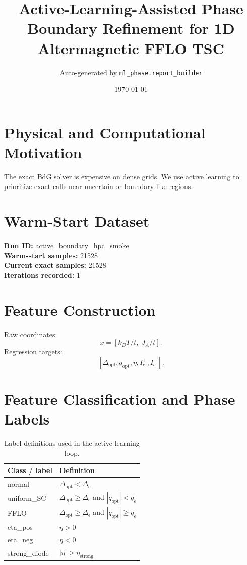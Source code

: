 \documentclass[11pt]{article}
\title{Active-Learning-Assisted Phase Boundary Refinement for 1D Altermagnetic FFLO TSC}
\author{Auto-generated by \texttt{ml\_phase.report\_builder}}
\date{\today}
\begin{document}
\maketitle

\section{Physical and Computational Motivation}
The exact BdG solver is expensive on dense grids. We use active learning to prioritize exact calls near uncertain or boundary-like regions.

\section{Warm-Start Dataset}
\textbf{Run ID:} active\_boundary\_hpc\_smoke\\
\textbf{Warm-start samples:} 21528\\
\textbf{Current exact samples:} 21528\\
\textbf{Iterations recorded:} 1

\section{Feature Construction}
Raw coordinates:
\[
x = [k_B T / t,\; J_A/t].
\]
Regression targets:
\[
[\Delta_{\mathrm{opt}}, q_{\mathrm{opt}}, \eta, I_c^+, I_c^-].
\]

\section{Feature Classification and Phase Labels}
\begin{table}[H]
\centering
\begin{tabular}{ll}
\toprule
Class / label & Definition \\
\midrule
normal & $\Delta_{\mathrm{opt}} < \Delta_{\epsilon}$ \\
uniform\_SC & $\Delta_{\mathrm{opt}} \ge \Delta_{\epsilon}$ and $|q_{\mathrm{opt}}| < q_{\epsilon}$ \\
FFLO & $\Delta_{\mathrm{opt}} \ge \Delta_{\epsilon}$ and $|q_{\mathrm{opt}}| \ge q_{\epsilon}$ \\
eta\_pos & $\eta > 0$ \\
eta\_neg & $\eta < 0$ \\
strong\_diode & $|\eta| > \eta_{\mathrm{strong}}$ \\
\bottomrule
\end{tabular}
\caption{Label definitions used in the active-learning loop.}
\end{table}
\end{document}

